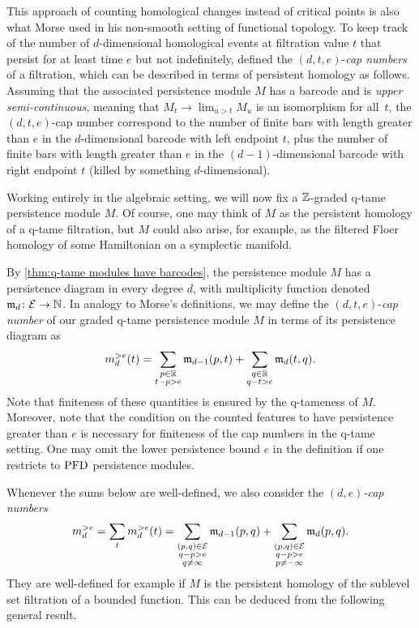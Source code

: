 This approach of counting homological changes instead of critical points is also what Morse used in his non-smooth setting of functional topology.
To keep track of the number of $d$-dimensional homological events at filtration value $t$ that persist for at least time $e$ but not indefinitely, \citet{Morse.1940} defined the $(d, t, e)$-\textit{cap numbers} of a filtration, which can be described in terms of persistent homology as follows.
Assuming that the associated persistence module $M$ has a barcode and is \emph{upper semi-continuous}, meaning that $M_{t} \to \lim_{u > t} M_{u}$ is an isomorphism for all~$t$, the $(d, t, e)$-cap number correspond to the number of finite bars with length greater than $e$ in the $d$-dimensional barcode with left endpoint $t$, plus the number of finite bars with length greater than $e$ in the $(d-1)$-dimensional barcode with right endpoint $t$ (killed by something $d$-dimensional).

Working entirely in the algebraic setting, we will now fix a $\mathbb{Z}$-graded q-tame persistence module $M$.
Of course, one may think of $M$ as the persistent homology of a q-tame filtration, but $M$ could also arise, for example, as the filtered Floer homology of some Hamiltonian on a symplectic manifold.

By \cref{thm:q-tame modules have barcodes}, the persistence module $M$ has a persistence diagram in every degree $d$, with multiplicity function denoted $\mathfrak{m}_d \colon \mathcal{E} \to \mathbb{N}$.
In analogy to Morse's definitions, we may define the $(d, t, e)$-\textit{cap number} of our graded q-tame persistence module $M$ in terms of its persistence diagram as
\[
m_{d}^{> e}(t) =
\sum_{\substack{p \in \mathbb{R} \\ t - p > e}} \mathfrak{m}_{d-1}(p, t) +
\sum_{\substack{q \in \mathbb{R} \\ q - t > e}} \mathfrak{m}_d(t, q).
\]
Note that finiteness of these quantities is ensured by the q-tameness of $M$. 
Moreover, note that the condition on the counted features to have persistence greater than $e$ is necessary for finiteness of the cap numbers in the q-tame setting. 
One may omit the lower persistence bound $e$ in the definition if one restricts to $\mathrm{PFD}$ persistence modules.

Whenever the sums below are well-defined, we also consider the \emph{$(d,e)$-cap numbers} 
\[
m_{d}^{> e } 
= \sum_{t} m_{d}^{> e}(t) 
=
\sum_{\substack{(p,q) \in \mathcal{E} \\ q - p > e \\ q \neq \infty}} \mathfrak{m}_{d-1}(p,q)
+
\sum_{\substack{(p,q) \in \mathcal{E} \\ q - p > e \\ p \neq -\infty}}\mathfrak{m}_d(p,q).
\] 
They are well-defined for example if $M$ is the persistent homology of the sublevel set filtration of a bounded function. This can be deduced from the following general result.

